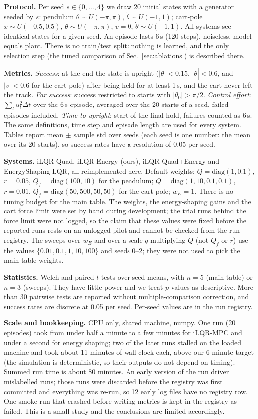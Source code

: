 \textbf{Protocol.} Per seed $s\in\{0,\dots,4\}$ we draw 20 initial states with a generator seeded by $s$: pendulum $\theta\sim U(-\pi,\pi)$, $\dot\theta\sim U(-1,1)$; cart-pole $x\sim U(-0.5,0.5)$, $\theta\sim U(-\pi,\pi)$, $v=0$, $\dot\theta\sim U(-1,1)$. All systems see identical states for a given seed. An episode lasts 6\,s (120 steps), noiseless, model equals plant. There is no train/test split: nothing is learned, and the only selection step (the tuned comparison of Sec.~\ref{sec:ablations}) is described there.

\textbf{Metrics.} \emph{Success}: at the end the state is upright ($|\theta|<0.15$, $|\dot\theta|<0.6$, and $|v|<0.6$ for the cart-pole) after being held for at least 1\,s, and the cart never left the track. \emph{Far success}: success restricted to starts with $|\theta_0|>\pi/2$. \emph{Control effort}: $\sum_t u_t^2\Delta t$ over the 6\,s episode, averaged over the 20 starts of a seed, failed episodes included. \emph{Time to upright}: start of the final hold, failures counted as 6\,s. The same definitions, time step and episode length are used for every system. Tables report mean $\pm$ sample std over seeds (each seed is one number: the mean over its 20 starts), so success rates have a resolution of 0.05 per seed.

\textbf{Systems.} iLQR-Quad, iLQR-Energy (ours), iLQR-Quad+Energy and EnergyShaping-LQR, all reimplemented here. Default weights: $Q=\mathrm{diag}(1,0.1)$, $r=0.05$, $Q_f=\mathrm{diag}(100,10)$ for the pendulum; $Q=\mathrm{diag}(1,10,0.1,0.1)$, $r=0.01$, $Q_f=\mathrm{diag}(50,500,50,50)$ for the cart-pole; $w_E=1$. There is no tuning budget for the main table. The weights, the energy-shaping gains and the cart force limit were set by hand during development; the trial runs behind the force limit were not logged, so the claim that these values were fixed before the reported runs rests on an unlogged pilot and cannot be checked from the run registry. The sweeps over $w_E$ and over a scale $q$ multiplying $Q$ (not $Q_f$ or $r$) use the values $\{0.01,0.1,1,10,100\}$ and seeds 0--2; they were not used to pick the main-table weights.

\textbf{Statistics.} Welch and paired $t$-tests over seed means, with $n=5$ (main table) or $n=3$ (sweeps). They have little power and we treat $p$-values as descriptive. More than 30 pairwise tests are reported without multiple-comparison correction, and success rates are discrete at 0.05 per seed. Per-seed values are in the run registry.

\textbf{Scale and bookkeeping.} CPU only, shared machine, numpy. One run (20 episodes) took from under half a minute to a few minutes for iLQR-MPC and under a second for energy shaping; two of the later runs stalled on the loaded machine and took about 11 minutes of wall-clock each, above our 6-minute target (the simulation is deterministic, so their outputs do not depend on timing). Summed run time is about 80 minutes. An early version of the run driver mislabelled runs; those runs were discarded before the registry was first committed and everything was re-run, so 12 early log files have no registry row. One smoke run that crashed before writing metrics is kept in the registry as failed. This is a small study and the conclusions are limited accordingly.
